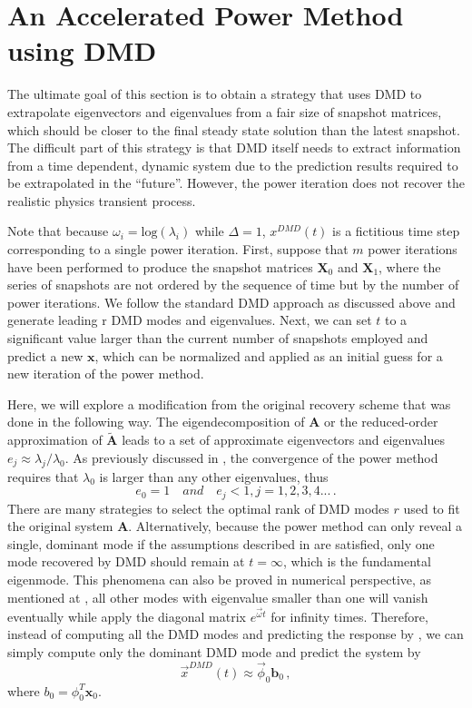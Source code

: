 \section{An Accelerated Power Method using DMD}
\label{sec:dmdpi}
The ultimate goal of this section is to obtain a strategy that uses DMD to extrapolate eigenvectors and eigenvalues from a fair size of snapshot matrices, which should be closer to the final steady state solution than the latest snapshot.
The difficult part of this strategy is that DMD itself needs to extract information from a time dependent, dynamic system due to the prediction results required to be extrapolated in the ``future''.
However, the power iteration does not recover the realistic physics transient process. 

Note that because $\omega_i= \text{log}(\lambda_i)$ while $\Delta = 1$, $x^{DMD}(t)$ is a fictitious time step corresponding to a single power iteration.
First, suppose that $m$ power iterations have been performed to produce the snapshot matrices $\mathbf{X}_0$ and $\mathbf{X}_1$, where the series of snapshots are not ordered by the sequence of time but by the number of power iterations.
We follow the standard DMD approach as discussed above and generate leading r DMD modes and eigenvalues.
Next, we can set $t$ to a significant value larger than the current number of snapshots employed and predict a new $\mathbf{x}$, which can be normalized and applied as an initial guess for a new iteration of the power method.

Here, we will explore a modification from the original recovery scheme that was done in the following way.
The eigendecomposition of $\mathbf{A}$ or the reduced-order approximation of $\mathbf{\tilde{A}}$ leads to a set of approximate eigenvectors and eigenvalues $e_j \approx \lambda_j / \lambda_0$.
As previously discussed in , the convergence of the power method requires that $\lambda_0$ is larger than any other eigenvalues, thus 
\begin{equation}
\label{eq:ej}
e_0 = 1 \quad and  \quad e_j < 1,j = 1,2,3,4... \, .
\end{equation}
There are many strategies to select the optimal rank of DMD modes $r$ used to fit the original system $\mathbf{A}$. 
Alternatively, because the power method can only reveal a single, dominant mode if the assumptions described in  are satisfied, only one mode recovered by DMD should remain at $t=\infty$, which is the fundamental eigenmode.
This phenomena can also be proved in numerical perspective, as mentioned at , all other modes with eigenvalue smaller than one will vanish eventually while apply the diagonal matrix $e^{\vec{\omega}t}$ for infinity times.
Therefore, instead of computing all the DMD modes and predicting the response by , we can simply compute only the dominant DMD mode and predict the system by 
\begin{equation}
\label{eq:f_mode}
\vec{x}^{DMD}(t) \approx \vec{\phi}_0 \mathbf{b}_0 \, ,
\end{equation}
where $b_0= \phi^{T}_0 \mathbf{x}_{0}$.

